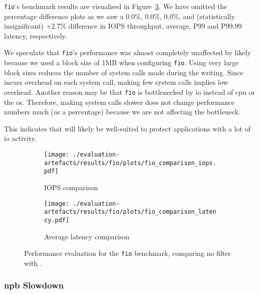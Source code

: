 \texttt{fio}'s benchmark results are visualised in Figure~\ref{fig:fio-perf}.
We have omitted the percentage difference plots as we saw a 0.0\%, 0.0\%, 0.0\%, and
(statistically insignificant) +2.7\% difference in IOPS throughput, average,
P99 and P99.99 latency, respectively. 

We speculate that \texttt{fio}'s performance was almost completely
unaffected by \af likely because we used a block size of 1MB when
configuring \texttt{fio}. Using very large block sizes reduces the number of
system calls made during the writing. Since \af incurs overhead on each
system call, making few system calls implies low overhead. Another reason
may be that \texttt{fio} is bottlenecked by \ac{io} instead of \ac{cpu} or
the \ac{os}. Therefore, making system calls slower does not change performance
numbers much (as a percentage) because we are not affecting the bottleneck.

This indicates that \af will likely be well-suited to protect applications with
a lot of \ac{io} activity.

\begin{figure}[htbp]
    \centering
    \begin{subfigure}[b]{0.48\textwidth}
        \centering
        \texttt{[image: ./evaluation-artefacts/results/fio/plots/fio\_comparison\_iops.pdf]}
        \caption{IOPS comparison}
        \label{fig:fio-iops}
    \end{subfigure}
    \hfill %
    \begin{subfigure}[b]{0.48\textwidth}
        \centering
        \texttt{[image: ./evaluation-artefacts/results/fio/plots/fio\_comparison\_latency.pdf]}
        \caption{Average latency comparison}
        \label{fig:fio-latency}
    \end{subfigure}

    \medskip %
    
    \caption{Performance evaluation for the \texttt{fio} benchmark, comparing no
    filter with \af{}.} %
    \label{fig:fio-perf}
\end{figure}



\subsubsection{\ac{npb} Slowdown}\label{subsubsec:npb-slowdown}

